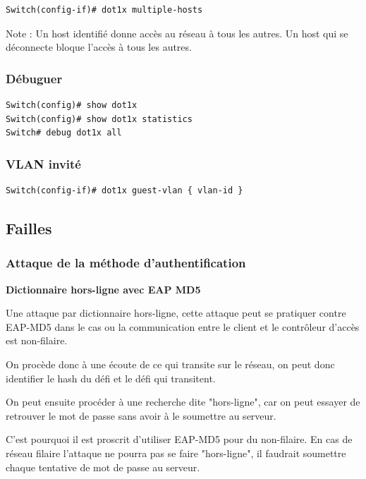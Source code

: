 \begin{verbatim}
Switch(config-if)# dot1x multiple-hosts
\end{verbatim}

Note : Un host identifié donne accès au réseau à tous les autres. Un host qui se déconnecte bloque l'accès à tous les autres.

\subsubsection{Débuguer}

\begin{verbatim}
Switch(config)# show dot1x
Switch(config)# show dot1x statistics
Switch# debug dot1x all
\end{verbatim}

\subsubsection{VLAN invité}

\begin{verbatim}
Switch(config-if)# dot1x guest-vlan { vlan-id }
\end{verbatim}

\subsection{Failles}

\subsubsection{Attaque de la méthode d'authentification}

\textbf{Dictionnaire hors-ligne avec EAP MD5}

Une attaque par dictionnaire hors-ligne, cette attaque peut se pratiquer contre EAP-MD5 dans le cas ou la communication entre le client et le contrôleur d'accès est non-filaire. 

On procède donc à une écoute de ce qui transite sur le réseau, on peut donc identifier le hash du défi et le défi qui transitent. 

On peut ensuite procéder à une recherche dite "hors-ligne", car on peut essayer de retrouver le mot de passe sans avoir à le soumettre au serveur. 

C'est pourquoi il est proscrit d'utiliser EAP-MD5 pour du non-filaire. En cas de réseau filaire l'attaque ne pourra pas se faire "hors-ligne", il faudrait soumettre chaque tentative de mot de passe au serveur. 

